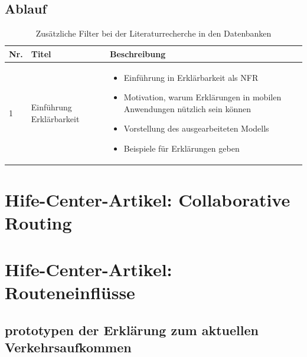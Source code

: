\subsection*{Ablauf}

\begin{table}[htb!]
    \centering
    \begin{tabular}{p{}p{}p{}}
        \hline
        Nr. & Titel                     & Beschreibung \\
        \toprule
        1   & Einführung Erklärbarkeit  &   \begin{itemize}
                                                \item Einführung in Erklärbarkeit als NFR
                                                \item Motivation, warum Erklärungen in mobilen Anwendungen nützlich sein können
                                                \item Vorstellung des ausgearbeiteten Modells
                                                \item Beispiele für Erklärungen geben
                                            \end{itemize} \\
        \bottomrule
    \end{tabular}
    \caption{Zusätzliche Filter bei der Literaturrecherche in den Datenbanken}
    \label{tab:appendix_literature_research_filters}
\end{table}

\section*{Hife-Center-Artikel: Collaborative Routing}
\label{sec:help_center_collaboratrive_routing}


\section*{Hife-Center-Artikel: Routeneinflüsse}
\label{sec:help_center_routing_data}


\subsection*{prototypen der Erklärung zum aktuellen Verkehrsaufkommen}
\label{sec:appendix_traffic_volume}

